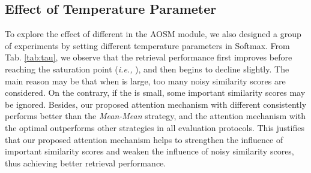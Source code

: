 \documentclass[sigconf]{acmart}
\begin{document}
\subsection{Effect of Temperature Parameter}
\begin{table}[]
\vspace{-0.2cm}
\caption{Retrieval performance with different temprature parameters  in Softmax on the MSR-VTT dataset.}
\vspace{-0.3cm}
\vspace{-0.4cm}
\label{tab:tau}
\end{table}





To explore the effect of different  in the AOSM module, we also designed a group of experiments by setting different temperature parameters  in Softmax. From Tab. \ref{tab:tau}, we observe that the retrieval performance first improves before reaching the saturation point (\emph{i.e.,} ), and then begins to decline slightly. The main reason may be that when  is large, too many noisy similarity scores are considered. On the contrary, if the  is small, some important similarity scores may be ignored. Besides, our proposed attention mechanism with different  consistently performs better than the \emph{Mean-Mean} strategy, and the attention mechanism with the optimal  outperforms other strategies in all evaluation protocols. This justifies that our proposed attention mechanism helps to strengthen the influence of important similarity scores and weaken the influence of noisy similarity scores, thus achieving better retrieval performance.
\end{document}
